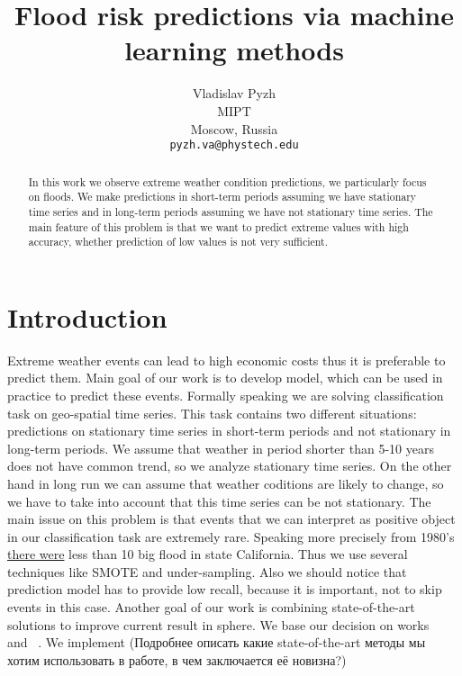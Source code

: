 \documentclass{article}
\title{Flood risk predictions via machine learning methods}
\author{ Vladislav Pyzh	\\
	MIPT\\
	Moscow, Russia \\
	\texttt{pyzh.va@phystech.edu} \\
}
\date{}
\begin{document}
\maketitle


\begin{abstract}
    In this work we observe extreme weather condition predictions, we particularly focus on floods. We make predictions in short-term periods assuming we have stationary time series and in long-term periods assuming we have not stationary time series. The main feature of this problem is that we want to predict extreme values with high accuracy, whether prediction of low values is not very sufficient.  
\end{abstract}

\section{Introduction}
Extreme weather events can lead to high economic costs thus it is preferable to predict them. Main goal of our work is to develop model, which can be used in practice to predict these events. Formally speaking we are solving classification task on geo-spatial time series. This task contains two different situations: predictions on stationary time series in short-term periods and not stationary in long-term periods. We assume that weather in period shorter than 5-10 years does not have common trend, so we analyze stationary time series. On the other hand in long run we can assume that weather coditions are likely to change, so we have to take into account that this time series can be not stationary. The main issue on this problem is that events that we can interpret as positive object in our classification task are extremely rare. Speaking more precisely from 1980's \href{http://www.overleaf.com}{there were} less than 10 big flood in state California. Thus we use several techniques like SMOTE and under-sampling. Also we should notice that prediction model has to provide low recall, because it is important, not to skip events in this case.  Another goal of our work is combining state-of-the-art solutions to improve current result in sphere. We base our decision on works ~\cite{put link here} and ~\cite{put link here}. We implement (Подробнее описать какие state-of-the-art методы мы хотим использовать в работе, в чем заключается её новизна?)
\end{document}
